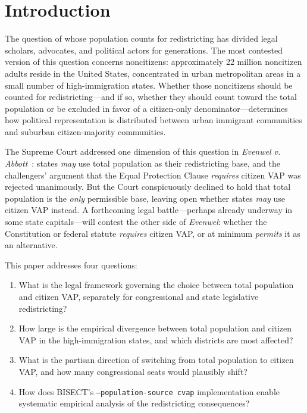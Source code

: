 \section{Introduction}
\label{sec:introduction}

The question of whose population counts for redistricting has divided legal scholars, advocates, and political actors for generations. The most contested version of this question concerns noncitizens: approximately 22 million noncitizen adults reside in the United States, concentrated in urban metropolitan areas in a small number of high-immigration states. Whether those noncitizens should be counted for redistricting---and if so, whether they should count toward the total population or be excluded in favor of a citizen-only denominator---determines how political representation is distributed between urban immigrant communities and suburban citizen-majority communities.

The Supreme Court addressed one dimension of this question in \emph{Evenwel v. Abbott}~\citep{evenwel2016}: states \emph{may} use total population as their redistricting base, and the challengers' argument that the Equal Protection Clause \emph{requires} citizen VAP was rejected unanimously. But the Court conspicuously declined to hold that total population is the \emph{only} permissible base, leaving open whether states \emph{may} use citizen VAP instead. A forthcoming legal battle---perhaps already underway in some state capitals---will contest the other side of \emph{Evenwel}: whether the Constitution or federal statute \emph{requires} citizen VAP, or at minimum \emph{permits} it as an alternative.

This paper addresses four questions:
\begin{enumerate}
    \item What is the legal framework governing the choice between total population and citizen VAP, separately for congressional and state legislative redistricting?
    \item How large is the empirical divergence between total population and citizen VAP in the high-immigration states, and which districts are most affected?
    \item What is the partisan direction of switching from total population to citizen VAP, and how many congressional seats would plausibly shift?
    \item How does BISECT's \texttt{--population-source cvap} implementation enable systematic empirical analysis of the redistricting consequences?
\end{enumerate}

